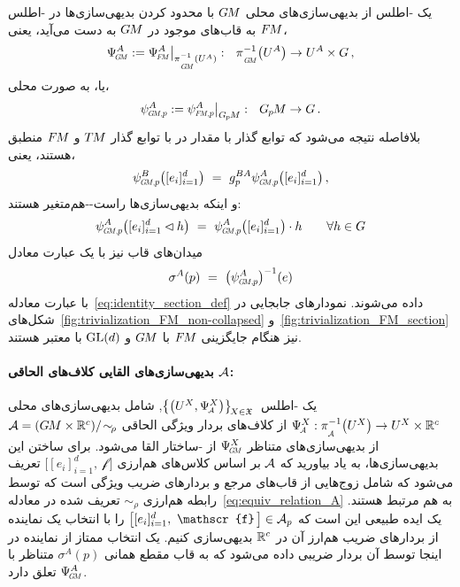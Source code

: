 یک -اطلس از بدیهی‌سازی‌های محلی $G\mkern-1.4muM$ با محدود کردن بدیهی‌سازی‌ها در -اطلس $F\mkern-1.5muM$ به قاب‌های موجود در $G\mkern-1.4muM$ به دست می‌آید، یعنی،
\begin{align}
	\PsiGM^A := \PsiFM^A \big|_{\piGM^{-1}(U^A)} :\ \ \piGM^{-1} \big(U^A\big) \to U^A \times G \,,
\end{align}
یا، به صورت محلی،
\begin{align}
	\psiGMp^A := \psiFMp^A \big|_{\GpM} :\ \ \GpM \to G \,.
\end{align}
بلافاصله نتیجه می‌شود که توابع گذار با مقدار در  با توابع گذار $T\mkern-1.5muM$ و $F\mkern-1.5muM$ منطبق هستند، یعنی،
\begin{align}\label{eq:transition_functions_GM}
	\psiGMp^B\big([e_{i}]_{i=1}^d\big)
	\ =\ g_p^{BA} \psiGMp^A\big([e_{i}]_{i=1}^d \big) \,,
\end{align}
و اینکه بدیهی‌سازی‌ها راست--هم‌متغیر هستند:
\begin{align}\label{eq:right_equivariance_GM}
	\psiGMp^A\big([e_{i}]_{i=1}^d \lhd h\big)
	\ =\ \psiGMp^A\big( [e_{i}]_{i=1}^d \big) \cdot h \qquad \forall h \in G
\end{align}
میدان‌های قاب نیز با یک عبارت معادل
\begin{align}\label{eq:GM_section_psi_inverse_def}
	\sigma^A(p)\ =\ \big( \psiGMp^A \big)^{-1}(e)
\end{align}
با عبارت معادله~\eqref{eq:identity_section_def} داده می‌شوند.
نمودارهای جابجایی در شکل‌های~\ref{fig:trivialization_FM_non-collapsed} و~\ref{fig:trivialization_FM_section} نیز هنگام جایگزینی $F\mkern-1.5muM$ با $G\mkern-1.4muM$ و $\operatorname{GL}(d)$ با  معتبر هستند.











\paragraph{بدیهی‌سازی‌های القایی کلاف‌های الحاقی $\mathcal{A}$:}

یک -اطلس
$\big\{ \big(U^X, \PsiA^X \big) \big\}_{\!X\in\mathfrak{X}}\,$,
شامل بدیهی‌سازی‌های محلی
$\PsiA^X:\piA^{-1}\big(U^X\big)\to U^X\times\R^c$
از کلاف‌های بردار ویژگی الحاقی
$\mathcal{A}=(G\mkern-1.4muM\times\mathbb{R}^c)/\!\sim_{\!\rho}$
از بدیهی‌سازی‌های متناظر $\PsiGM^X$ از -ساختار القا می‌شود.
برای ساختن این بدیهی‌سازی‌ها، به یاد بیاورید که $\mathcal{A}$ بر اساس کلاس‌های هم‌ارزی
$\big[ [e_{i}]_{i=1}^d,\ \mathscr{f}\,\big]$
تعریف می‌شود که شامل زوج‌هایی از قاب‌های مرجع و بردارهای ضریب ویژگی است که توسط رابطه هم‌ارزی $\sim_{\!\rho}$ تعریف شده در معادله~\eqref{eq:equiv_relation_A} به هم مرتبط هستند.
یک ایده طبیعی این است که
$\big[ [e_{i}]_{i=1}^d,\ \mathscr{f}\,\big]\in\A_p$
را با انتخاب یک نماینده از بردارهای ضریب هم‌ارز آن در $\mathbb{R}^c$ بدیهی‌سازی کنیم.
یک انتخاب ممتاز از نماینده در اینجا توسط آن بردار ضریبی داده می‌شود که به قاب مقطع همانی $\sigma^A(p)$ متناظر با $\PsiGM^A$ تعلق دارد.

